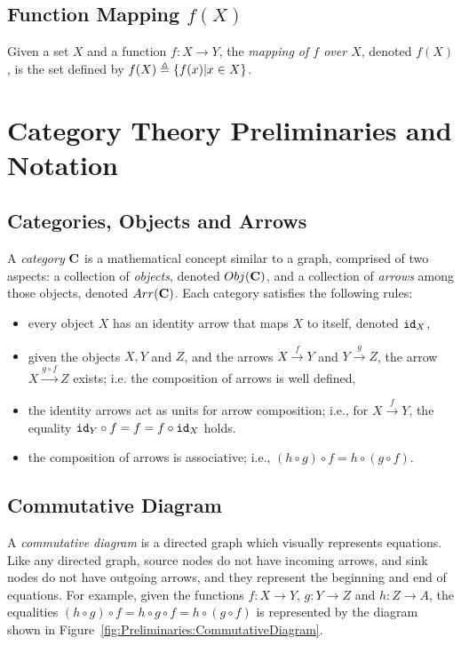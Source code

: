 \subsection{Function Mapping $f(X)$}
Given a set $X$ and a function $f\colon X\rightarrow Y$, the \emph{mapping of $f$ over $X$}, denoted $f(X)$, is the set defined by $f(X)\triangleq\left\{f(x)| x\in X\right\}$.

\section{Category Theory Preliminaries and Notation}

\subsection{Categories, Objects and Arrows}
A \emph{category} $\AsCategory{C}$ is a mathematical concept similar to a graph, comprised of two aspects: a collection of \emph{objects}, denoted $Obj(\AsCategory{C})$, and a collection of \emph{arrows} among those objects, denoted $Arr(\AsCategory{C})$. Each category satisfies the following  rules:
\begin{itemize}
    \item every object $X$ has an identity arrow that maps $X$ to itself, denoted ${\texttt{id}}_X$,
    \item given the objects $X, Y$ and $Z$, and the arrows $X\xrightarrow{f}Y$ and $Y\xrightarrow{g}Z$, the arrow $X\xrightarrow{g\circ f}Z$ exists; i.e. the composition of arrows is well defined,
    \item the identity arrows act as units for arrow composition; i.e., for $X\xrightarrow{f}Y$, the equality ${\texttt{id}}_{Y}\circ f=f=f\circ {\texttt{id}}_{X}$ holds.
    \item the composition of arrows is associative; i.e., $(h\circ g)\circ f = h \circ (g\circ f)$.
\end{itemize}

\subsection{Commutative Diagram}
A \emph{commutative diagram} is a directed graph which visually represents equations. Like any directed graph, source nodes do not have incoming arrows, and sink nodes do not have outgoing arrows, and they represent the beginning and end of equations. For example, given the functions $f\colon X\rightarrow Y$, $g\colon Y\rightarrow Z$ and $h\colon Z\rightarrow A$, the equalities $(h\circ g)\circ f= h\circ g \circ f= h \circ (g\circ f)$ is represented by the diagram shown in Figure~\ref{fig:Preliminaries:CommutativeDiagram}.

